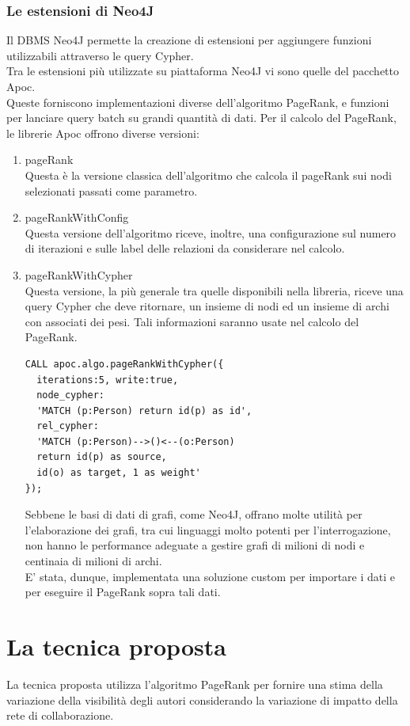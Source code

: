 \documentclass[a4paper, 12pt]{article}
\let\oldsection\section
\renewcommand\section{\clearpage\oldsection}
\begin{document}
\subsubsection{Le estensioni di Neo4J}
Il DBMS Neo4J permette la creazione di estensioni per aggiungere funzioni utilizzabili attraverso le query Cypher. \\
Tra le estensioni più utilizzate su piattaforma Neo4J vi sono quelle del pacchetto Apoc. \\
Queste forniscono implementazioni diverse dell'algoritmo PageRank, e funzioni per lanciare query batch su grandi quantità di dati.
Per il calcolo del PageRank, le librerie Apoc offrono diverse versioni:
\begin{enumerate}
  \item pageRank \\
  Questa è la versione classica dell'algoritmo che calcola il pageRank sui nodi selezionati passati come parametro.
  \item pageRankWithConfig \\
  Questa versione dell'algoritmo riceve, inoltre, una configurazione sul numero di iterazioni e sulle label delle relazioni da considerare nel calcolo.
  \item pageRankWithCypher \\
  Questa versione, la più generale tra quelle disponibili nella libreria, riceve una query Cypher che deve ritornare, un insieme di nodi ed un insieme di archi con associati dei pesi. Tali informazioni saranno usate nel calcolo del PageRank.
  \begin{lstlisting}
CALL apoc.algo.pageRankWithCypher({
  iterations:5, write:true, 
  node_cypher:
  'MATCH (p:Person) return id(p) as id',
  rel_cypher: 
  'MATCH (p:Person)-->()<--(o:Person)
  return id(p) as source,
  id(o) as target, 1 as weight'
});
\end{lstlisting} 

\par
Sebbene le basi di dati di grafi, come Neo4J, offrano molte utilità per l'elaborazione dei grafi, tra cui linguaggi molto potenti per l'interrogazione, non hanno le performance adeguate a gestire grafi di milioni di nodi e centinaia di milioni di archi. \\
E' stata, dunque, implementata una soluzione custom per importare i dati e per eseguire il PageRank sopra tali dati.
\end{enumerate}

\section{La tecnica proposta}
La tecnica proposta utilizza l'algoritmo PageRank per fornire una stima della variazione della visibilità degli autori considerando la variazione di impatto della rete di collaborazione. 
\end{document}
